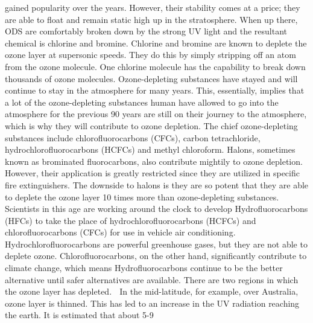 gained popularity over the years. However, their stability comes at a price; they are able to float and remain static high up in the stratosphere. When up there, ODS are comfortably broken down by the strong UV light and the resultant chemical is chlorine and bromine. Chlorine and bromine are known to deplete the ozone layer at supersonic speeds. They do this by simply stripping off an atom from the ozone molecule. One chlorine molecule has the capability to break down thousands of ozone molecules. Ozone-depleting substances have stayed and will continue to stay in the atmosphere for many years. This, essentially, implies that a lot of the ozone-depleting substances human have allowed to go into the atmosphere for the previous 90 years are still on their journey to the atmosphere, which is why they will contribute to ozone depletion. The chief ozone-depleting substances include chlorofluorocarbons (CFCs), carbon tetrachloride, hydrochlorofluorocarbons (HCFCs) and methyl chloroform. Halons, sometimes known as brominated fluorocarbons, also contribute mightily to ozone depletion. However, their application is greatly restricted since they are utilized in specific fire extinguishers. The downside to halons is they are so potent that they are able to deplete the ozone layer 10 times more than ozone-depleting substances. Scientists in this age are working around the clock to develop Hydrofluorocarbons (HFCs) to take the place of hydrochlorofluorocarbons (HCFCs) and chlorofluorocarbons (CFCs) for use in vehicle air conditioning. Hydrochlorofluorocarbons are powerful greenhouse gases, but they are not able to deplete ozone. Chlorofluorocarbons, on the other hand, significantly contribute to climate change, which means Hydrofluorocarbons continue to be the better alternative until safer alternatives are available. There are two regions in which the ozone layer has depleted.  In the mid-latitude, for example, over Australia, ozone layer is thinned. This has led to an increase in the UV radiation reaching the earth. It is estimated that about 5-9%

